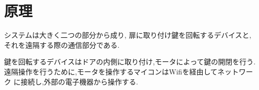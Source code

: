 \section{原理}
システムは大きく二つの部分から成り,
扉に取り付け鍵を回転するデバイスと,
それを遠隔する際の通信部分である.

鍵を回転するデバイスはドアの内側に取り付け,モータによって鍵の開閉を行う.
遠隔操作を行うために,モータを操作するマイコンはWifiを経由してネットワーク
に接続し,外部の電子機器から操作する.

